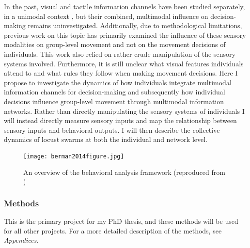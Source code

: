 \documentclass[11pt,a4paper,oneside]{article}
\begin{document}
	\par
	In the past, visual and tactile information channels have been studied separately, in a unimodal context \citep{bazazi2008collective}, but their combined, multimodal influence on decision-making remains uninvestigated. Additionally, due to methodological limitations, previous work on this topic has primarily examined the influence of these sensory modalities on group-level movement and not on the movement decisions of individuals. This work also relied on rather crude manipulation of the sensory systems involved. Furthermore, it is still unclear what visual features individuals attend to and what rules they follow when making movement decisions. Here I propose to investigate the dynamics of how individuals integrate multimodal information channels for decision-making and subsequently how individual decisions influence group-level movement through multimodal information networks. Rather than directly manipulating the sensory systems of individuals I will instead directly measure sensory inputs and map the relationship between sensory inputs and behavioral outputs. I will then describe the collective dynamics of locust swarms at both the individual and network level. 
	
\begin{figure}
	\begin{center}
		\texttt{[image: berman2014figure.jpg]}\\
	\end{center}
	\begin{flushleft}
		\caption{An overview of the behavioral analysis framework (reproduced from \citealp{berman2014drosopholid,berman2014mapping}) \label{fig:berman2014}} 
	\end{flushleft}
\end{figure} 

	\subsubsection{Methods} \label{sec:methods}
	
	This is the primary project for my PhD thesis, and these methods will be used for all other projects. For a more detailed description of the methods, see \textit{Appendices}.
	
\end{document}
